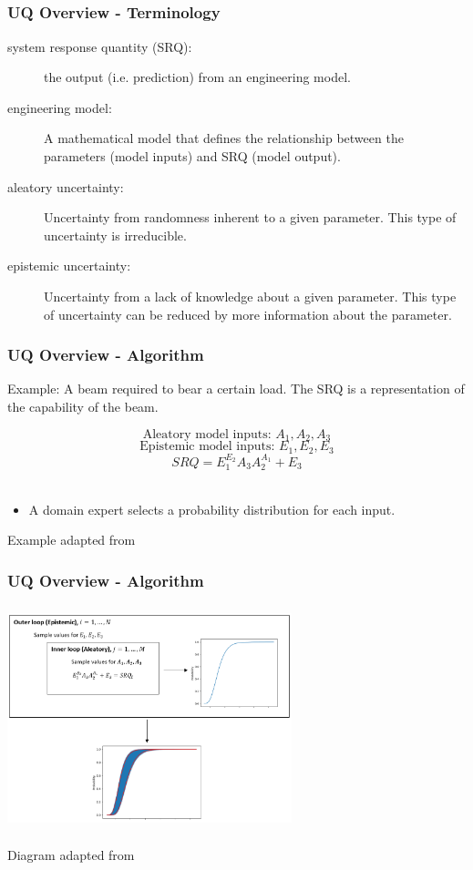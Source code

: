 \documentclass[handout, xcolor=dvipsnames]{beamer}
\begin{document}
\subsection{}
\begin{frame}
	\frametitle{UQ Overview - Terminology}
	\begin{description}
	  \item[system response quantity (SRQ):] the output (i.e. prediction) from an engineering model.
		  \item[engineering model:] A mathematical model that defines the relationship between the parameters (model inputs) and SRQ (model output). 
		\item[aleatory uncertainty:] Uncertainty from randomness inherent to a given parameter. This type of uncertainty is irreducible.
	  \item[epistemic uncertainty:] Uncertainty from a lack of knowledge about a given parameter. This type of uncertainty can be reduced by more information about the parameter.


	\end{description}
\end{frame}


\begin{frame}
	\frametitle{UQ Overview - Algorithm}
	Example: A beam required to bear a certain load. The SRQ is a representation of the capability of the beam.
	
	\[\text{Aleatory model inputs: }A_1, A_2, A_3 \]
	\[\text{Epistemic model inputs: }E_1, E_2, E_3\]
	\[ SRQ = E_1^{E_2}A_3A_2^{A_1} + E_3\]
	\\
	\begin{itemize}
	\item A domain expert selects a probability distribution for each input.
	\end{itemize}	
	\begin{center}
	{\scriptsize Example adapted from \cite{EW2018}}
	\end{center}
\end{frame}

\begin{frame}
	\frametitle{UQ Overview - Algorithm}
	\begin{center}
	\begin{center} 
	\includegraphics[height=6.5cm,width=8.25cm]{figures/uq_algo.png}
	\end{center}	
	{\tiny Diagram adapted from \cite{EW2018}}
	\end{center}
\end{frame}
\end{document}
